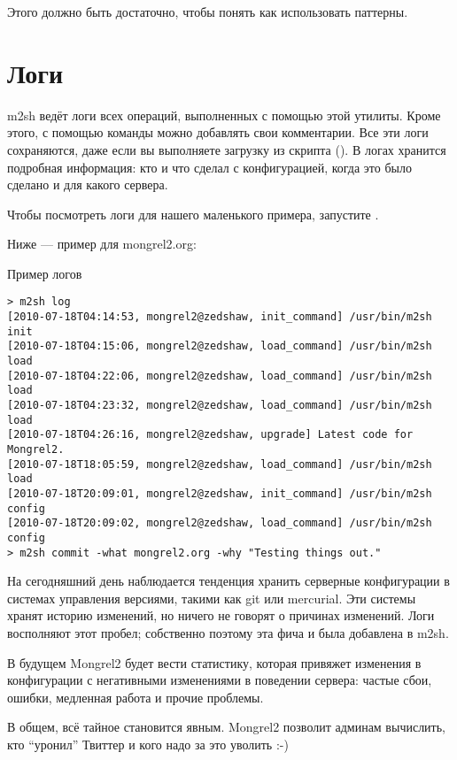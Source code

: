 Этого должно быть достаточно, чтобы понять как использовать паттерны.

\section{Логи}

m2sh ведёт логи всех операций, выполненных с помощью этой утилиты.
Кроме этого, с помощью команды  можно добавлять
свои комментарии. Все эти логи сохраняются, даже если вы выполняете
загрузку из скрипта (). В логах хранится подробная
информация: кто и что сделал с конфигурацией, когда это было сделано и
для какого сервера.

Чтобы посмотреть логи для нашего маленького примера, запустите
.

Ниже --- пример для mongrel2.org:

\begin{code}{Пример логов}
\begin{lstlisting}
> m2sh log
[2010-07-18T04:14:53, mongrel2@zedshaw, init_command] /usr/bin/m2sh init
[2010-07-18T04:15:06, mongrel2@zedshaw, load_command] /usr/bin/m2sh load
[2010-07-18T04:22:06, mongrel2@zedshaw, load_command] /usr/bin/m2sh load
[2010-07-18T04:23:32, mongrel2@zedshaw, load_command] /usr/bin/m2sh load
[2010-07-18T04:26:16, mongrel2@zedshaw, upgrade] Latest code for Mongrel2.
[2010-07-18T18:05:59, mongrel2@zedshaw, load_command] /usr/bin/m2sh load
[2010-07-18T20:09:01, mongrel2@zedshaw, init_command] /usr/bin/m2sh config
[2010-07-18T20:09:02, mongrel2@zedshaw, load_command] /usr/bin/m2sh config
> m2sh commit -what mongrel2.org -why "Testing things out."
\end{lstlisting}
\end{code}

На сегодняшний день наблюдается тенденция хранить серверные
конфигурации в системах управления версиями, такими как git или
mercurial. Эти системы хранят историю изменений, но ничего не говорят
о причинах изменений. Логи восполняют этот пробел; собственно поэтому
эта фича и была добавлена в m2sh.

В будущем Mongrel2 будет вести статистику, которая привяжет изменения
в конфигурации с негативными изменениями в поведении сервера: частые
сбои, ошибки, медленная работа и прочие проблемы.

В общем, всё тайное становится явным. Mongrel2 позволит админам
вычислить, кто ``уронил'' Твиттер и кого надо за это уволить :-)

